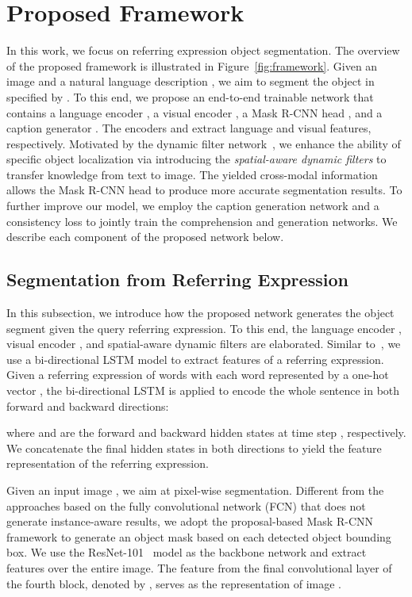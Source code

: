 \documentclass{bmvc2k}
\begin{document}
\section{Proposed Framework}
In this work, we focus on referring expression object segmentation. 
The overview of the proposed framework is illustrated in Figure~\ref{fig:framework}.
Given an image  and a natural language description , we aim to segment the object in  specified by .
To this end, we propose an end-to-end trainable network that contains a language encoder , a visual encoder , a Mask R-CNN head , and a caption generator .
The encoders  and  extract language and visual features, respectively. 
Motivated by the dynamic filter network~\cite{Brabandere_NIPS_2016}, we enhance the ability of specific object localization via introducing the {\em spatial-aware dynamic filters} to transfer knowledge from text to image.
The yielded cross-modal information allows the Mask R-CNN head  to produce more accurate segmentation results.
To further improve our model, we employ the caption generation network  and a consistency loss  to jointly train the comprehension and generation networks.
We describe each component of the proposed network below.



\subsection{Segmentation from Referring Expression}
In this subsection, we introduce how the proposed network generates the object segment given the query referring expression. 
To this end, the language encoder , visual encoder , and spatial-aware dynamic filters are elaborated.
\label{sec:seg}
{}
Similar to~\cite{Yu_CVPR_2018}, we use a bi-directional LSTM model to extract features of a referring expression. 
Given a referring expression  of  words with each word  represented by a one-hot vector , the bi-directional LSTM  is applied to encode the whole sentence in both forward and backward directions:

where  and  are the forward and backward hidden states at time step , respectively. 
We concatenate the final hidden states in both directions to yield the feature representation  of the referring expression.


{}
Given an input image , we aim at pixel-wise segmentation.
Different from the approaches based on the fully convolutional network (FCN) that does not generate instance-aware results, we adopt the proposal-based Mask R-CNN~\cite{He_ICCV_2017} framework to generate an object mask based on each detected object bounding box.
We use the ResNet-101~\cite{He_CVPR_2016} model as the backbone network and extract features over the entire image. 
The feature from the final convolutional layer of the fourth block, denoted by , serves as the representation of image .
\end{document}
